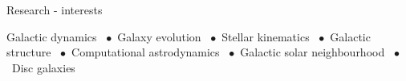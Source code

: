 \begin{rubric}{Research - interests}
\begin{minipage}[t]{1\textwidth}
Galactic dynamics \ $\bullet$\  Galaxy evolution \ $\bullet$\  Stellar kinematics \ $\bullet$\  Galactic structure \ $\bullet$\   Computational astrodynamics \ $\bullet$\  Galactic solar neighbourhood \ $\bullet$\  Disc galaxies
\end{minipage}
\end{rubric}